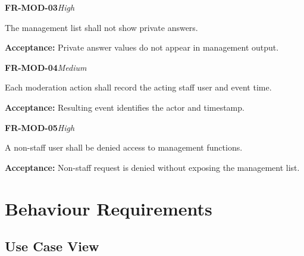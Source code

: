 \documentclass[12pt,a4paper,oneside]{report}
\begin{document}
\noindent\begin{minipage}{\linewidth}\textbf{FR-MOD-03}\hfill\textit{High}\par\nopagebreak

The management list shall not show private answers.

{\color{muted}\textbf{Acceptance:} Private answer values do not appear in management output.\par}\end{minipage}\par\vspace{5pt}

\noindent\begin{minipage}{\linewidth}\textbf{FR-MOD-04}\hfill\textit{Medium}\par\nopagebreak

Each moderation action shall record the acting staff user and event time.

{\color{muted}\textbf{Acceptance:} Resulting event identifies the actor and timestamp.\par}\end{minipage}\par\vspace{5pt}

\noindent\begin{minipage}{\linewidth}\textbf{FR-MOD-05}\hfill\textit{High}\par\nopagebreak

A non-staff user shall be denied access to management functions.

{\color{muted}\textbf{Acceptance:} Non-staff request is denied without exposing the management list.\par}\end{minipage}\par\vspace{5pt}


\section{Behaviour Requirements}


\subsection{Use Case View}
\end{document}
